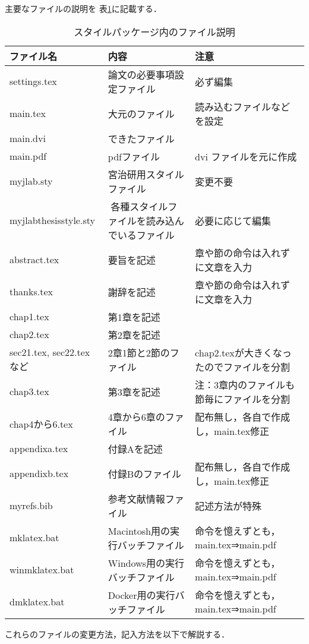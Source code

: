 主要なファイルの説明を 表\ref{table:files2}に記載する．
\begin{table}[H]
\begin{center}
\caption{スタイルパッケージ内のファイル説明}
\vspace{-2mm}
{\footnotesize
\begin{tabular}{|l|l|l|}
\hline
ファイル名 & 内容 & 注意\\\hline\hline
settings.tex & 論文の必要事項設定ファイル & 必ず編集\\\hline
main.tex & 大元のファイル & 読み込むファイルなどを設定\\\hline
main.dvi & できたファイル & \\\hline
main.pdf & pdfファイル & dvi ファイルを元に作成\\\hline
myjlab.sty & 宮治研用スタイルファイル & 変更不要\\\hline
myjlabthesisstyle.sty & 各種スタイルファイルを読み込んでいるファイル & 必要に応じて編集\\\hline
abstract.tex & 要旨を記述 & 章や節の命令は入れずに文章を入力\\\hline
thanks.tex & 謝辞を記述 & 章や節の命令は入れずに文章を入力\\\hline
chap1.tex & 第1章を記述 & \\\hline
chap2.tex & 第2章を記述 & \\\hline
sec21.tex, sec22.tex など& 2章1節と2節のファイル & chap2.texが大きくなったのでファイルを分割\\\hline
chap3.tex & 第3章を記述 & 注：3章内のファイルも節毎にファイルを分割\\\hline
chap4から6.tex & 4章から6章のファイル & 配布無し，各自で作成し，main.tex修正\\\hline
appendixa.tex & 付録Aを記述 & \\\hline
appendixb.tex & 付録Bのファイル & 配布無し，各自で作成し，main.tex修正\\\hline
myrefs.bib & 参考文献情報ファイル & 記述方法が特殊\\\hline
mklatex.bat & Macintosh用の実行バッチファイル & 命令を憶えずとも，main.tex⇒main.pdf\\\hline
winmklatex.bat & Windows用の実行バッチファイル & 命令を憶えずとも，
main.tex⇒main.pdf\\\hline
dmklatex.bat & Docker用の実行バッチファイル & 命令を憶えずとも，
main.tex⇒main.pdf\\\hline
\end{tabular}
}
\label{table:files2}
\end{center}
\end{table}

これらのファイルの変更方法，記入方法を以下で解説する．
